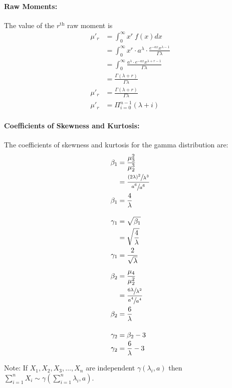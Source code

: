 \documentclass[
10pt, %
a4paper, %
]{report}
\begin{document}
\paragraph{Raw Moments:}
The value of the \(r^{\text{th}}\) raw moment is
\begin{align*}
    \mu'_r &= \int_0^\infty x^r\:f(x)dx \\
           &= \int_0^\infty x^r \cdot a^{\lambda} \cdot \frac{e^{-ax} x^{\lambda -1}}{\Gamma \lambda} \\
           &= \int_0^\infty \frac{a^{\lambda} \cdot e^{-ax} x^{\lambda + r -1}}{\Gamma \lambda} \\
           &= \frac{\Gamma (\lambda+r)}{\Gamma \lambda} \\
    \mu'_r &= \frac{\Gamma (\lambda+r)}{\Gamma \lambda} \\
    \mu'_r &= \Pi_{i=0}^{n-1}(\lambda+i)
\end{align*}

\paragraph{Coefficients of Skewness and Kurtosis:}
The coefficients of skewness and kurtosis for the gamma distribution are:
\begin{align*}
    \beta_1 &= \frac{\mu_3^2}{\mu_2^3} \\
            &= \dfrac{\sfrac{(2\lambda)^2}{\lambda^3}}{\sfrac{a^6}{a^6}} \\
    \beta_1 &= \frac{4}{\lambda} \\ \\
    \gamma_1 &= \sqrt{\beta_1} \\
             &= \sqrt{\frac{4}{\lambda}} \\
    \gamma_1 &= \frac{2}{\sqrt{\lambda}} \\ \\
    \beta_2 &= \frac{\mu_4}{\mu_2^2} \\
            &= \dfrac{\sfrac{6\lambda}{\lambda^2}}{\sfrac{a^4}{a^4}} \\
    \beta_2 &= \frac{6}{\lambda} \\ \\
    \gamma_2 &= \beta_2 - 3 \\
    \gamma_2 &= \frac{6}{\lambda} -3 \\
\end{align*}

Note:
If \(X_1, X_2, X_3, \dots, X_n\) are independent \(\gamma(\lambda_i, a)\) then \(\sum_{i=1}^n X_i \sim \gamma(\sum_{i=1}^n \lambda_i, a)\).
\end{document}
